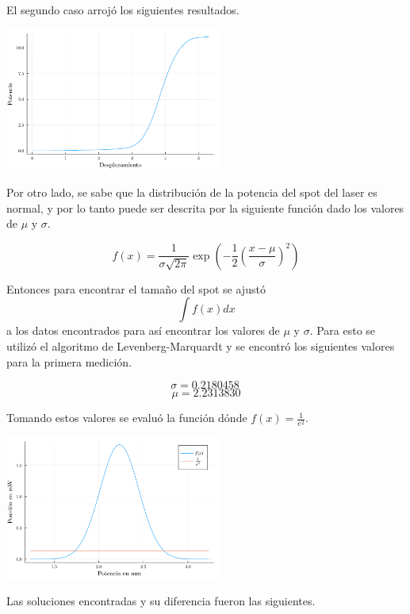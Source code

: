 \documentclass[twocolumn]{article}
\begin{document}
		El segundo caso arrojó los siguientes resultados.

		\begin{center}
			\includegraphics[width=200pt]{img/measurement_2.pdf}
		\end{center}

		Por otro lado, se sabe que la distribución de la potencia del spot del laser es normal, y por lo tanto puede ser descrita por la siguiente función dado los valores de $\mu$ y $\sigma$.
		
		$$
		f(x) = \frac{1}{\sigma\sqrt{2\pi}}\exp({-\frac{1}{2}(\frac{x-\mu}{\sigma})^2})
		$$

		Entonces para encontrar el tamaño del spot se ajustó
		$$\int{f(x)dx}$$
		a los datos encontrados para así encontrar los valores de $\mu$ y $\sigma$. Para esto se utilizó el algoritmo de Levenberg-Marquardt y se encontró los siguientes valores para la primera medición.

		$$
		\sigma = 0.2180458 \
		$$
		$$
		\mu = 2.2313830
		$$

		Tomando estos valores se evaluó la función dónde $f(x) = \frac{1}{e^2}$.

		\begin{center}
			\includegraphics[width=200pt]{img/normal_1.pdf}
		\end{center}

		Las soluciones encontradas y su diferencia fueron las siguientes.
\end{document}
